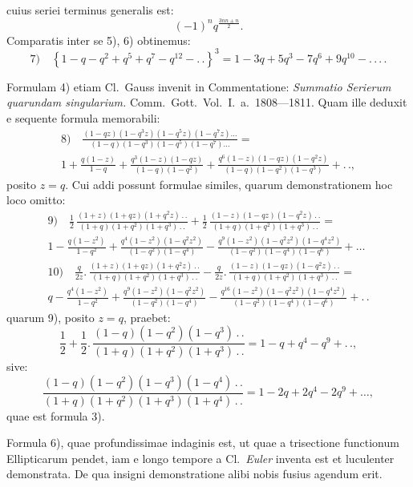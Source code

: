\documentclass{article}
\begin{document}
cuius seriei terminus generalis est:
\[
(-1)^{n}q^{\frac{3nn\pm n}{2}}.
\]
Comparatis inter se 5), 6) obtinemus:
\[
\text{7)}\quad\left\{1-q-q^{2}+q^{5}+q^{7}-q^{12}-.\,.\right\}^{3}=1-3q+5q^{3}-7q^{6}+9q^{10}-.\,.\,.\,.
\]

Formulam 4) etiam Cl.\ Gauss invenit in Commentatione: \emph{Summatio Serierum quarundam singularium.} Comm.\ Gott.\ Vol.\ I.\ a.\ 1808---1811. Quam ille deduxit e sequente formula memorabili:
\[
\begin{gathered}
\text{8)}\quad\frac{(1-qz)(1-q^{3}z)(1-q^{5}z)(1-q^{7}z)\ldots}{(1-q)(1-q^{3})(1-q^{5})(1-q^{7})\ldots}=\\[1.5ex]
1+\frac{q(1-z)}{1-q}+\frac{q^{3}(1-z)(1-qz)}{(1-q)(1-q^{2})}+\frac{q^{6}(1-z)(1-qz)(1-q^{2}z)}{(1-q)(1-q^{2})(1-q^{3})}+.\,.,
\end{gathered}
\]
posito $z=q$. Cui addi possunt formulae similes, quarum demonstrationem hoc loco omitto:
\[
\begin{gathered}
\text{9)}\quad\frac{1}{2}\,\frac{(1+z)(1+qz)(1+q^{2}z)\,.\,.}{(1+q)(1+q^{2})(1+q^{3})\,.\,.}+\frac{1}{2}\,\frac{(1-z)(1-qz)(1-q^{2}z)\,.\,.}{(1+q)(1+q^{2})(1+q^{3})\,.\,.}=\\[1.5ex]
1-\frac{q(1-z^{2})}{1-q^{2}}+\frac{q^{4}(1-z^{2})(1-q^{2}z^{2})}{(1-q^{2})(1-q^{4})}-\frac{q^{9}(1-z^{2})(1-q^{2}z^{2})(1-q^{4}z^{2})}{(1-q^{2})(1-q^{4})(1-q^{6})}+\ldots\\[2ex]
\text{10)}\quad\frac{q}{2z}.\,\frac{(1+z)(1+qz)(1+q^{2}z)\,.\,.}{(1+q)(1+q^{2})(1+q^{3})\,.\,.}-\frac{q}{2z}.\,\frac{(1-z)(1-qz)(1-q^{2}z)\,.\,.}{(1+q)(1+q^{2})(1+q^{3})\,.\,.}=\\[1.5ex]
q-\frac{q^{4}(1-z^{2})}{1-q^{2}}+\frac{q^{9}(1-z^{2})(1-q^{2}z^{2})}{(1-q^{2})(1-q^{4})}-\frac{q^{16}(1-z^{2})(1-q^{2}z^{2})(1-q^{4}z^{2})}{(1-q^{2})(1-q^{4})(1-q^{6})}+.\,.
\end{gathered}
\]
quarum 9), posito $z=q$, praebet:
\[
\frac{1}{2}+\frac{1}{2}.\,\frac{(1-q)(1-q^{2})(1-q^{3})\,.\,.}{(1+q)(1+q^{2})(1+q^{3})\,.\,.}=1-q+q^{4}-q^{9}+.\,.,
\]
sive:
\[
\frac{(1-q)(1-q^{2})(1-q^{3})(1-q^{4})\,.\,.}{(1+q)(1+q^{2})(1+q^{3})(1+q^{4})\,.\,.}=1-2q+2q^{4}-2q^{9}+\ldots,
\]
quae est formula 3).

Formula 6), quae profundissimae indaginis est, ut quae a trisectione functionum Ellipticarum pendet, iam e longo tempore a Cl.\ \emph{Euler} inventa est et luculenter demonstrata. De qua insigni demonstratione alibi nobis fusius agendum erit.

\end{document}
